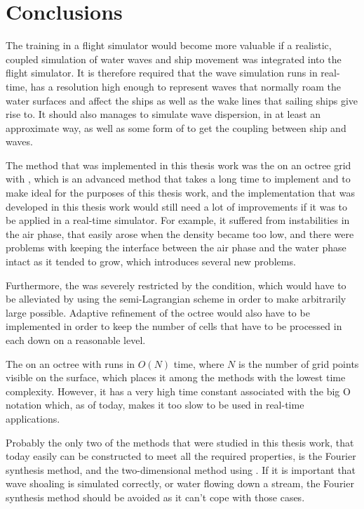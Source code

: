 \chapter{Conclusions}
\label{chap:conclusions}

The training in a flight simulator would become more valuable if a realistic, coupled simulation of water waves and ship movement was integrated into the flight simulator. It is therefore required that the wave simulation runs in real-time, has a resolution high enough to represent waves that normally roam the water surfaces and affect the ships as well as the wake lines that sailing ships give rise to. It should also manages to simulate wave dispersion, in at least an approximate way, as well as some form of \FSI to get the coupling between ship and waves.

The method that was implemented in this thesis work was the \FVM on an octree grid with \FSM, which is an advanced method that takes a long time to implement and to make ideal for the purposes of this thesis work, and the implementation that was developed in this thesis work would still need a lot of improvements if it was to be applied in a real-time simulator. For example, it suffered from instabilities in the air phase, that easily arose when the density became too low, and there were problems with keeping the interface between the air phase and the water phase intact as it tended to grow, which introduces several new problems.

Furthermore, the \timestep was severely restricted by the \CFL condition, which would have to be alleviated by using the semi-Lagrangian scheme in order to make arbitrarily large \timesteps possible. Adaptive refinement of the octree would also have to be implemented in order to keep the number of cells that have to be processed in each \timestep down on a reasonable level.

The \FVM on an octree with \FSM runs in $O(N)$ time, where $N$ is the number of grid points visible on the surface, which places it among the methods with the lowest time complexity. However, it has a very high time constant associated with the big O notation which, as of today, makes it too slow to be used in real-time applications.

Probably the only two of the methods that were studied in this thesis work, that today easily can be constructed to meet all the required properties, is the Fourier synthesis method, and the two-dimensional method using \LPD. If it is important that wave shoaling is simulated correctly, or water flowing down a stream, the Fourier synthesis method should be avoided as it can't cope with those cases.


